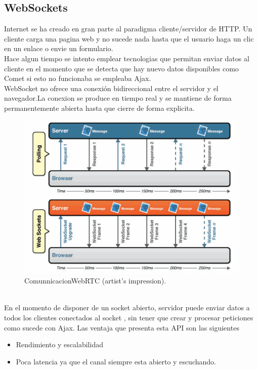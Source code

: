 \subsection{WebSockets}
Internet se ha creado en gran parte al paradigma cliente/servidor de HTTP. Un cliente carga una pagina web y no sucede nada hasta que el usuario haga un clic en un enlace o envie un formulario.
\\Hace algun tiempo se intento emplear tecnologias que permitan enviar datos al cliente en el momento que se detecta que hay nuevo datos disponibles como Comet si esto no funcionaba se empleaba Ajax. 
\\WebSocket no ofrece una conexión bidireccional entre el servidor y el navegador.La conexion se produce en tiempo real y se mantiene de forma permanentemente abierta hasta que cierre de forma explicita.
\begin{figure}[!h]
\centering
\includegraphics[width=0.5\linewidth]{Figures/websocketsDiag}
\decoRule
\caption[An Electron]{ComunnicacionWebRTC (artist's impression).}
\label{fig:ComunnicacionWebRTC}
\end{figure}
\\En el momento de disponer de un socket abierto, servidor puede enviar datos a todos los clientes conectados al socket , sin tener que crear y procesar peticiones como sucede con Ajax. Las ventaja que presenta esta API son las siguientes 
\begin{itemize}
\item Rendimiento y escalabilidad
\item Poca latencia ya que el canal siempre esta abierto y escuchando.
\end{itemize}

